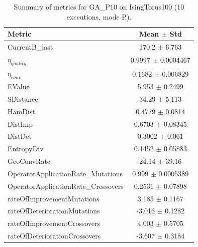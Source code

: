 \begin{table}[t]
\centering
\small
\begin{tabular}{lc}
\toprule
Metric & Mean $\pm$ Std \\
\midrule
CurrentB\_last & 170.2 $\pm$ 6.763 \\
$\eta_{quality}$ & 0.9997 $\pm$ 0.0004467 \\
$\eta_{conv}$ & 0.1682 $\pm$ 0.006829 \\
EValue & 5.953 $\pm$ 0.2499 \\
SDistance & 34.29 $\pm$ 5.113 \\
HamDist & 0.4779 $\pm$ 0.0814 \\
DistImp & 0.6703 $\pm$ 0.08345 \\
DistDet & 0.3002 $\pm$ 0.061 \\
EntropyDiv & 0.1452 $\pm$ 0.05883 \\
GeoConvRate & 24.14 $\pm$ 39.16 \\
OperatorApplicationRate\_Mutations & 0.999 $\pm$ 0.0005389 \\
OperatorApplicationRate\_Crossovers & 0.2531 $\pm$ 0.07898 \\
rateOfImprovementMutations & 3.185 $\pm$ 0.1167 \\
rateOfDeteriorationMutations & -3.016 $\pm$ 0.1282 \\
rateOfImprovementCrossovers & 4.003 $\pm$ 0.5705 \\
rateOfDeteriorationCrossovers & -3.607 $\pm$ 0.3184 \\
\bottomrule
\end{tabular}
\caption{Summary of metrics for GA_P10 on IsingTorus100 (10 executions, mode P).}
\label{tab:summary_GA_P10_IsingTorus100}
\end{table}
